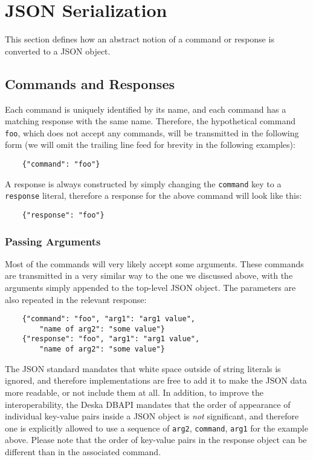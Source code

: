 \documentclass{article}
\begin{document}
\section{JSON Serialization}

This section defines how an abstract notion of a command or response is converted to a JSON object.

\subsection{Commands and Responses}

Each command is uniquely identified by its name, and each command has a matching response with the same name. Therefore,
the hypothetical command {\tt foo}, which does not accept any commands, will be transmitted in the following form (we
will omit the trailing line feed for brevity in the following examples):

\begin{lstlisting}
    {"command": "foo"}
\end{lstlisting}

A response is always constructed by simply changing the {\tt command} key to a {\tt response} literal, therefore a
response for the above command will look like this:

\begin{lstlisting}
    {"response": "foo"}
\end{lstlisting}

\subsubsection{Passing Arguments}

Most of the commands will very likely accept some arguments.  These commands are transmitted in a very similar way to
the one we discussed above, with the arguments simply appended to the top-level JSON object.  The parameters are also
repeated in the relevant response:

\begin{lstlisting}
    {"command": "foo", "arg1": "arg1 value",
        "name of arg2": "some value"}
    {"response": "foo", "arg1": "arg1 value",
        "name of arg2": "some value"}
\end{lstlisting}

The JSON standard mandates that white space outside of string literals is ignored, and therefore implementations are
free to add it to make the JSON data more readable, or not include them at all.  In addition, to improve the
interoperability, the Deska DBAPI mandates that the order of appearance of individual key-value pairs inside a JSON
object is {\em not} significant, and therefore one is explicitly allowed to use a sequence of {\tt arg2}, {\tt command},
{\tt arg1} for the example above.  Please note that the order of key-value pairs in the response object can be different
than in the associated command.
\end{document}

